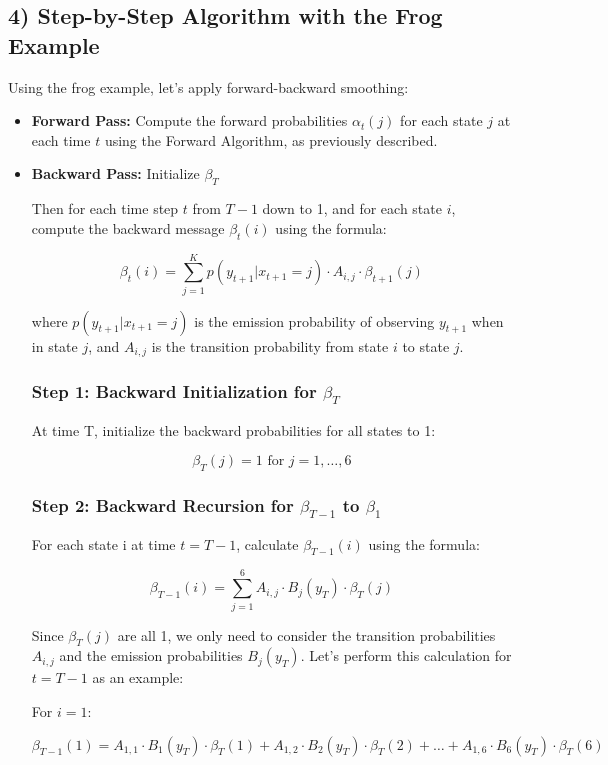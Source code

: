\documentclass[10pt]{article}
\begin{document}
\subsection*{4) Step-by-Step Algorithm with the Frog Example}
Using the frog example, let's apply forward-backward smoothing:

\begin{itemize}
  \item \textbf{Forward Pass:} Compute the forward probabilities \( \alpha_t(j) \) for each state \( j \) at each time \( t \) using the Forward Algorithm, as previously described.
  \item \textbf{Backward Pass:} Initialize \( \beta_T \)

Then for each time step \( t \) from \( T-1 \) down to 1, and for each state \( i \), compute the backward message \( \beta_{t}(i) \) using the formula:

\[ \beta_{t}(i) = \sum_{j=1}^{K} p(y_{t+1}|x_{t+1}=j) \cdot A_{i,j} \cdot \beta_{t+1}(j) \]

where \( p(y_{t+1}|x_{t+1}=j) \) is the emission probability of observing \( y_{t+1} \) when in state \( j \), and \( A_{i,j} \) is the transition probability from state \( i \) to state \( j \).

\subsubsection*{Step 1: Backward Initialization for \( \beta_T \)}
At time T, initialize the backward probabilities for all states to 1:

\[ \beta_T(j) = 1 \text{ for } j = 1, \ldots, 6 \]

\subsubsection*{Step 2: Backward Recursion for \( \beta_{T-1} \) to \( \beta_1 \)}
For each state i at time \( t = T-1 \), calculate \( \beta_{T-1}(i) \) using the formula:

\[ \beta_{T-1}(i) = \sum_{j=1}^{6} A_{i,j} \cdot B_j(y_T) \cdot \beta_T(j) \]

Since \( \beta_T(j) \) are all 1, we only need to consider the transition probabilities \( A_{i,j} \) and the emission probabilities \( B_j(y_T) \). Let's perform this calculation for \( t = T-1 \) as an example:

For \( i = 1 \):

\[ \beta_{T-1}(1) = A_{1,1} \cdot B_1(y_T) \cdot \beta_T(1) + A_{1,2} \cdot B_2(y_T) \cdot \beta_T(2) + \ldots + A_{1,6} \cdot B_6(y_T) \cdot \beta_T(6) \]


\end{itemize}
\end{document}
